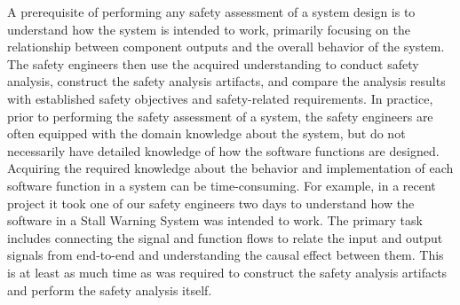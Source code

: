 


A prerequisite of performing any safety assessment of a system design is to understand how the system is intended to work, primarily focusing on the relationship between component outputs and the overall behavior of the system. The safety engineers then use the acquired understanding to conduct safety analysis, construct the safety analysis artifacts, and compare the analysis results with established safety objectives and safety-related requirements. In practice, prior to performing the safety assessment of a system, the safety engineers are often equipped with the domain knowledge about the system, but do not necessarily have detailed knowledge of how the software functions are designed. Acquiring the required knowledge about the behavior and implementation of each software function in a system can be time-consuming. For example, in a recent project it took one of our safety engineers two days to understand how the software in a Stall Warning System was intended to work. The primary task includes connecting the signal and function flows to relate the input and output signals from end-to-end and understanding the causal effect between them. This is at least as much time as was required to construct the safety analysis artifacts and perform the safety analysis itself.

